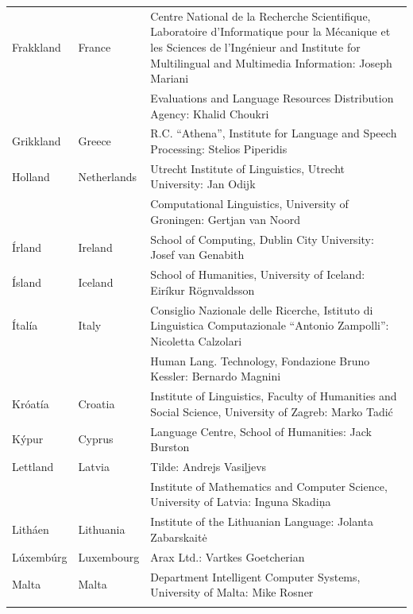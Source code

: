 \begin{longtable}{llp{105mm}}
  Frakkland & \textcolor{grey1}{France} & Centre National de la Recherche Scientifique, Laboratoire d'Informatique pour la Mécanique et les Sciences de l'Ingénieur and Institute for Multilingual and Multimedia Information: Joseph Mariani \\ \addlinespace
  & & Evaluations and Language Resources Distribution Agency: Khalid Choukri\\ \addlinespace 
  Grikkland & \textcolor{grey1}{Greece} & R.C. “Athena”, Institute for Language and Speech Processing: Stelios Piperidis\\ \addlinespace 
  Holland & \textcolor{grey1}{Netherlands} & Utrecht Institute of Linguistics, Utrecht University: Jan Odijk\\ \addlinespace 
  & & Computational Linguistics, University of Groningen: Gertjan van Noord\\ \addlinespace
  Írland & \textcolor{grey1}{Ireland} & School of Computing, Dublin City University: Josef van Genabith\\ \addlinespace
  Ísland & \textcolor{grey1}{Iceland} & School of Humanities, University of Iceland: Eiríkur Rögnvaldsson\\ \addlinespace
  Ítalía & \textcolor{grey1}{Italy} & Consiglio Nazionale delle Ricerche, Istituto di Linguistica Computazionale \newline “Antonio Zampolli”: Nicoletta Calzolari\\ \addlinespace
  & & Human Lang. Technology, Fondazione Bruno Kessler: Bernardo Magnini\\ \addlinespace 
  Króatía & \textcolor{grey1}{Croatia} & Institute of Linguistics, Faculty of Humanities and Social Science, University of Zagreb: Marko Tadić \\ \addlinespace
  Kýpur & \textcolor{grey1}{Cyprus} & Language Centre, School of Humanities: Jack Burston\\ \addlinespace 
  Lettland & \textcolor{grey1}{Latvia} & Tilde: Andrejs Vasiļjevs\\ \addlinespace 
  & & Institute of Mathematics and Computer Science, University of Latvia: \newline Inguna Skadiņa\\ \addlinespace
  Litháen & \textcolor{grey1}{Lithuania} & Institute of the Lithuanian Language: Jolanta Zabarskaitė\\ \addlinespace
  Lúxembúrg & \textcolor{grey1}{Luxembourg} & Arax Ltd.: Vartkes Goetcherian\\ \addlinespace
  Malta & \textcolor{grey1}{Malta} & Department Intelligent Computer Systems, University of Malta: Mike Rosner\\ \addlinespace

\end{longtable}
